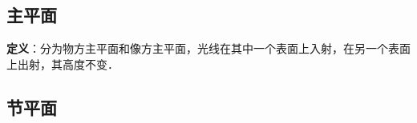 
\begin{issues}
\issueDraft
\end{issues}


\subsection{主平面}

\textbf{定义}：分为物方主平面和像方主平面，光线在其中一个表面上入射，在另一个表面上出射，其高度不变．

\subsection{节平面}